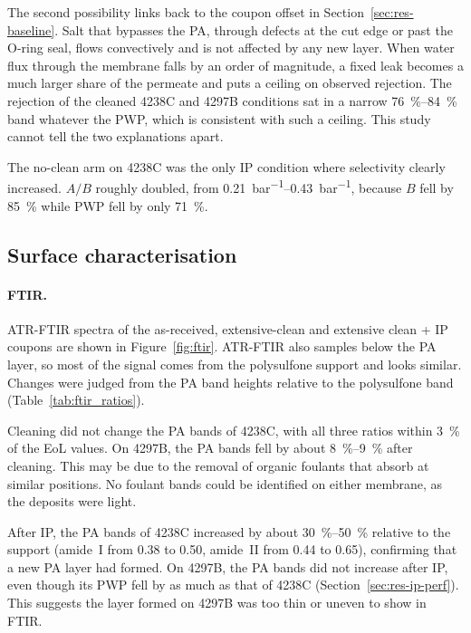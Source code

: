 The second possibility links back to the coupon offset in Section~\ref{sec:res-baseline}. Salt that bypasses the PA, through defects at the cut edge or past the O-ring seal, flows convectively and is not affected by any new layer. When water flux through the membrane falls by an order of magnitude, a fixed leak becomes a much larger share of the permeate and puts a ceiling on observed rejection. The rejection of the cleaned 4238C and 4297B conditions sat in a narrow \qtyrange{76}{84}{\percent} band whatever the PWP, which is consistent with such a ceiling. This study cannot tell the two explanations apart. 

The no-clean arm on 4238C was the only IP condition where selectivity clearly increased. $A/B$ roughly doubled, from \qtyrange{0.21}{0.43}{bar^{-1}}, because $B$ fell by \qty{85}{\percent} while PWP fell by only \qty{71}{\percent}.
\fi


\subsection{Surface characterisation}
\label{sec:res-surface}
\paragraph{FTIR.}
ATR-FTIR spectra of the as-received, extensive-clean and extensive clean + IP coupons are shown in Figure~\ref{fig:ftir}. ATR-FTIR also samples below the PA layer, so most of the signal comes from the polysulfone support and looks similar. Changes were judged from the PA band heights relative to the polysulfone band (Table~\ref{tab:ftir_ratios}).

Cleaning did not change the PA bands of 4238C, with all three ratios within \qty{3}{\percent} of the EoL values. On 4297B, the PA bands fell by about \qtyrange{8}{9}{\percent} after cleaning. This may be due to the removal of organic foulants that absorb at similar positions. No foulant bands could be identified on either membrane, as the deposits were light.

After IP, the PA bands of 4238C increased by about \qtyrange{30}{50}{\percent} relative to the support (amide~I from 0.38 to 0.50, amide~II from 0.44 to 0.65), confirming that a new PA layer had formed. On 4297B, the PA bands did not increase after IP, even though its PWP fell by as much as that of 4238C (Section~\ref{sec:res-ip-perf}). This suggests the layer formed on 4297B was too thin or uneven to show in FTIR.

